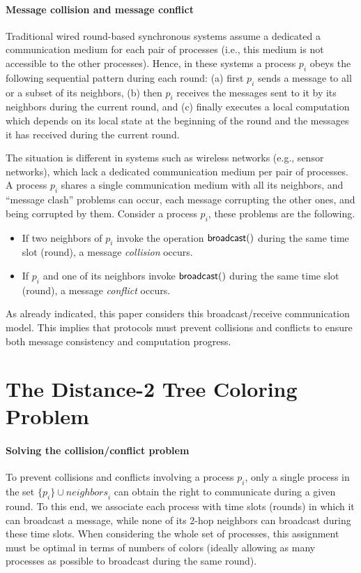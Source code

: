 \documentclass[11pt,english]{article}
\newcommand{\neighbors}{\mathit{neighbors}}
\begin{document}
\paragraph{Message collision and message conflict}
Traditional wired round-based synchronous systems assume a dedicated a
communication medium for each pair of processes (i.e., this medium is
not accessible to the other processes).  Hence, in these systems a
process $p_i$ obeys the following sequential pattern during each
round: (a) first $p_i$ sends a message to all or a subset of its
neighbors, (b) then $p_i$ receives the messages sent to it by its
neighbors during the current round, and (c) finally executes a local
computation which depends on its local state at the beginning of the
round and the messages it has received during the current round.

The situation is different in systems such as wireless networks (e.g.,
sensor networks), which lack a dedicated communication medium per pair
of processes.  A process $p_i$ shares a single communication medium
with all its neighbors, and ``message clash'' problems can occur,
each message corrupting the other ones, and being corrupted by
them. Consider a process $p_i$, these problems are the following.
\begin{itemize}
\vspace{-0.1cm}
\item 
If two  neighbors of $p_i$ invoke the operation ${\sf broadcast}()$  
during the same time slot (round), a message {\it collision} occurs.  
\vspace{-0.2cm}
\item 
If $p_i$ and one  of its neighbors 
invoke ${\sf broadcast}()$  during the same time slot 
(round), a message {\it conflict} occurs.  
\end{itemize}
As already indicated, this paper considers this broadcast/receive
communication model. This implies that protocols must prevent
collisions and conflicts to ensure both message consistency and
computation progress.




\section{The Distance-2 Tree Coloring Problem}
\label{sec:D2-coloring}

\paragraph{Solving the collision/conflict problem}
To prevent collisions and conflicts involving a process $p_i$, only a
single process in the set $\{p_i\}\cup \neighbors_i$ can obtain the
right to communicate during a given round. To this end, we associate
each process with time slots (rounds) in which it can broadcast a
message, while none of its 2-hop neighbors can broadcast during these
time slots. When considering the whole set of processes, this
assignment must be optimal in terms of numbers of colors (ideally
allowing as many processes as possible to broadcast during the same
round).
\end{document}
